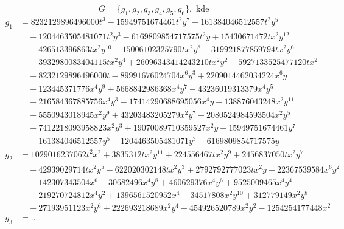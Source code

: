 $$ G = \{g_1, g_2, g_3, g_4, g_5, g_6 \}, \text{ kde } $$
\begin{align*}
g_1 &= 8232129896496000t^3 - 15949751674461t^2y^7 - 161384046512557t^2y^5 \\
&\quad - 1204463505481071t^2y^3 - 6169809854717575t^2y + 15430671472tx^2y^{12} \\
&\quad + 426513396863tx^2y^{10} - 15006102325790tx^2y^8 - 319921877859794tx^2y^6 \\
&\quad + 3932980083404115tx^2y^4 + 26096343414243210tx^2y^2 - 5927133525477120tx^2 \\
&\quad + 8232129896496000t - 89991676024704x^6y^3 + 2209014462034224x^6y \\
&\quad - 123445371776x^4y^9 + 5668842986368x^4y^7 - 43236019313379x^4y^5 \\ 
&\quad + 216584367885756x^4y^3 - 17414290688695056x^4y - 138876043248x^2y^{11} \\
&\quad + 5550943018945x^2y^9 + 43203483205279x^2y^7 - 2080524984593504x^2y^5 \\
&\quad - 7412218093958823x^2y^3 + 19070089710359527x^2y - 15949751674461y^7 \\
&\quad - 161384046512557y^5 - 1204463505481071y^3 - 6169809854717575y \\
g_2 &= 1029016237062t^2x^2 + 3835312tx^2y^{11} + 224556467tx^2y^9 + 2456837050tx^2y^7 \\
&\quad - 42939029714tx^2y^5 - 622020302148tx^2y^3 + 2792792777023tx^2y - 22367539584x^6y^2\\
&\quad - 142307343504x^6 - 30682496x^4y^8 + 460629376x^4y^6 + 9525009465x^4y^4 \\
&\quad + 219270724812x^4y^2 + 1396561520952x^4 - 34517808x^2y^{10} + 312779149x^2y^8 \\
&\quad + 27193951123x^2y^6 + 222693218689x^2y^4 + 454926520789x^2y^2 - 1254254177448x^2 \\
g_3 &= \dots 
\end{align*}

